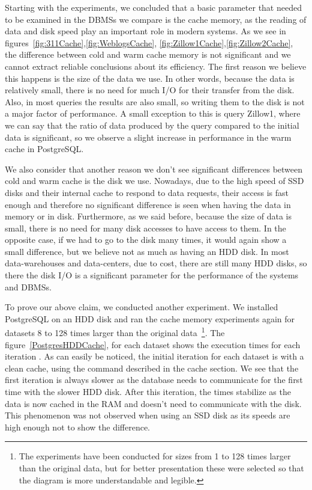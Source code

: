 Starting with the experiments, we concluded that a basic parameter that needed to be examined 
in the DBMSs we compare is the cache memory, as the reading of data and disk speed play an 
important role in modern systems. As we see in figures~\ref{fig:311Cache},\ref{fig:WeblogsCache},
\ref{fig:Zillow1Cache},\ref{fig:Zillow2Cache}, the difference between cold and warm 
cache memory is not significant and we cannot extract reliable conclusions about its efficiency. 
The first reason we believe this happens is the size of the data we use. In other words, 
because the data is relatively small, there is no need for much I/O for their transfer from 
the disk. Also, in most queries the results are also small, so writing them to the disk is 
not a major factor of performance. A small exception to this is query Zillow1, where we 
can say that the ratio of data produced by the query compared to the initial data is 
significant, so we observe a slight increase in performance in the warm cache in PostgreSQL.

We also consider that another reason we don't see significant differences between cold and 
warm cache is the disk we use. Nowadays, due to the high speed of SSD disks and their internal 
cache to respond to data requests, their access is fast enough and therefore no significant 
difference is seen when having the data in memory or in disk. Furthermore, as we said before, 
because the size of data is small, there is no need for many disk accesses to have access to 
them. In the opposite case, if we had to go to the disk many times, it would again show a 
small difference, but we believe not as much as having an HDD disk. In most data-warehouses 
and data-centers, due to cost, there are still many HDD disks, so there the disk I/O is a 
significant parameter for the performance of the systems and DBMSs.

To prove our above claim, we conducted another experiment. We installed PostgreSQL on an HDD 
disk and ran the cache memory experiments again for datasets 8 to 128 times larger than the 
original data~\footnote{The experiments have been conducted for sizes from 1 to 128 times 
larger than the original data, but for better presentation these were selected so that the 
diagram is more understandable and legible.}. The figure~\ref{PostgresHDDCache}, for each 
dataset shows the execution times for each iteration . As can easily be noticed, the initial 
iteration for each dataset is with a clean cache, using the command described in the cache 
section. We see that the first iteration is always slower as the database needs to communicate 
for the first time with the slower HDD disk. After this iteration, the times stabilize as the 
data is now cached in the RAM and doesn't need to communicate with the disk. This phenomenon 
was not observed when using an SSD disk as its speeds are high enough not to show the difference.


